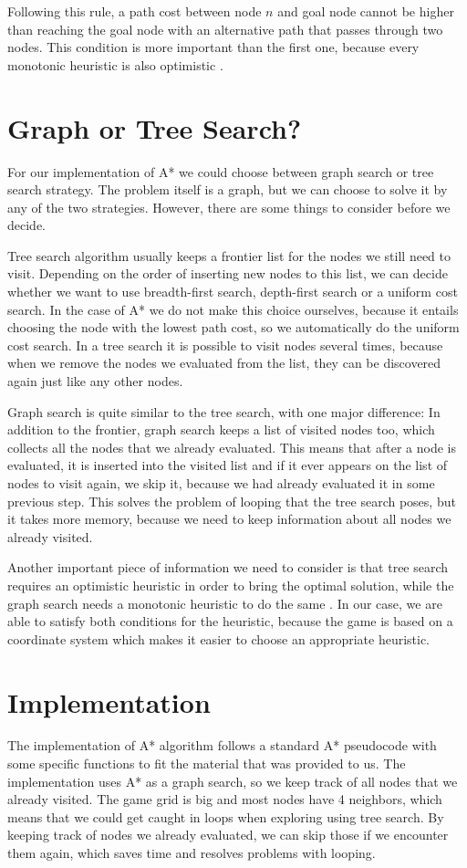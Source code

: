 \documentclass[a4paper]{article}
\begin{document}
Following this rule, a path cost between node $n$ and goal node cannot be higher than reaching the goal node with an alternative path that passes through two nodes. This condition is more important than the first one, because every monotonic heuristic is also optimistic \citep{russell2009artificial}.

\section{Graph or Tree Search?}
For our implementation of A* we could choose between graph search or tree search strategy. The problem itself is a graph, but we can choose to solve it by any of the two strategies. However, there are some things to consider before we decide.

Tree search algorithm usually keeps a frontier list for the nodes we still need to visit. Depending on the order of inserting new nodes to this list, we can decide whether we want to use breadth-first search, depth-first search or a uniform cost search. In the case of A* we do not make this choice ourselves, because it entails choosing the node with the lowest path cost, so we automatically do the uniform cost search. In a tree search it is possible to visit nodes several times, because when we remove the nodes we evaluated from the list, they  can be discovered again just like any other nodes.

Graph search is quite similar to the tree search, with one major difference: In addition to the frontier, graph search keeps a list of visited nodes too, which collects all the nodes that we already evaluated. This means that after a node is evaluated, it is inserted into the visited list and if it ever appears on the list of nodes to visit again, we skip it, because we had already evaluated it in some previous step. This solves the problem of looping that the tree search poses, but it takes more memory, because we need to keep information about all nodes we already visited.

Another important piece of information we need to consider is that tree search requires an optimistic heuristic in order to bring the optimal solution, while the graph search needs a monotonic heuristic to do the same \citep{russell2009artificial}. In our case, we are able to satisfy both conditions for the heuristic, because the game is based on a coordinate system which makes it easier to choose an appropriate heuristic.

\section{Implementation}
The implementation of A* algorithm follows a standard A* pseudocode with some specific functions to fit the material that was provided to us. The implementation uses A* as a graph search, so we keep track of all nodes that we already visited. The game grid is big and most nodes have 4 neighbors, which means that we could get caught in loops when exploring using tree search. By keeping track of nodes we already evaluated, we can skip those if we encounter them again, which saves time and resolves problems with looping.
\end{document}
